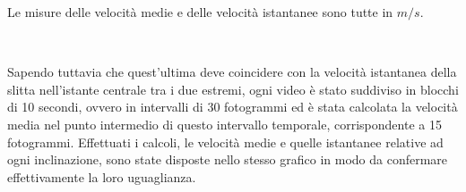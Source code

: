 \documentclass[a4paper,11pt,titlepage]{book}
\begin{document}
 
\begin{flushleft}
Le misure delle velocità medie e delle velocità istantanee sono tutte in $m/s$.
\end{flushleft}

\begin{figure}[h!]
\vspace{0.5cm}
\hspace{0.3cm}
 \\
\vspace{0.5cm}
\hspace{0.3cm}
\end{figure}







\begin{flushleft}
Sapendo tuttavia che quest’ultima deve coincidere con la velocità istantanea della slitta nell’istante centrale tra i due estremi, ogni video è stato suddiviso in blocchi di 10 secondi, ovvero in intervalli di 30 fotogrammi ed è stata calcolata la velocità media nel punto intermedio di questo intervallo temporale, corrispondente a 15 fotogrammi. Effettuati i calcoli, le velocità medie e quelle istantanee relative ad ogni inclinazione, sono state disposte nello stesso grafico in modo da confermare effettivamente la loro uguaglianza.
\end{flushleft}

\vspace{2cm}
\end{document}

